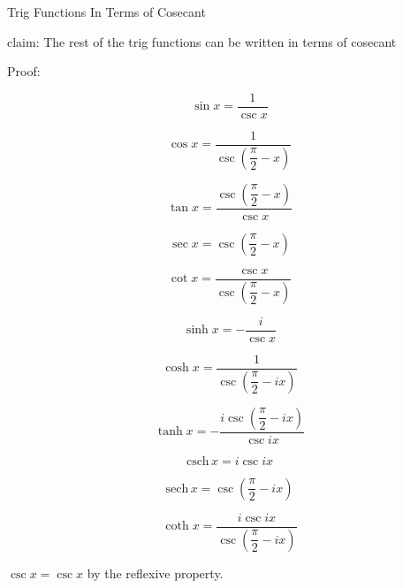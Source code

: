 \documentclass[12pt]{article}
\begin{document}
\pagebreak\begin{section}{Trig Functions In Terms of Cosecant}
	
	\noindent claim: The rest of the trig functions can be written in terms of cosecant

	\noindent Proof:

	\begin{equation}\sin x=\dfrac1{\csc x}\end{equation}

	\begin{equation}\cos x=\dfrac1{\csc\left(\dfrac\pi2-x\right)}\end{equation}

	\begin{equation}\tan x=\dfrac{\csc\left(\dfrac\pi2-x\right)}{\csc x}\end{equation}

	
	\begin{equation}\sec x=\csc\left(\dfrac\pi2-x\right)\end{equation}

	\begin{equation}\cot x=\dfrac{\csc x}{\csc\left(\dfrac\pi2-x\right)}\end{equation}


	\begin{equation}\sinh x=-\dfrac i{\csc x}\end{equation}

	\begin{equation}\cosh x=\dfrac1{\csc\left(\dfrac\pi2-ix\right)}\end{equation}

	\begin{equation}\tanh x=-\dfrac{i\csc\left(\dfrac\pi2-ix\right)}{\csc ix}\end{equation}

	\begin{equation}\text{csch}\,x=i\csc ix\end{equation}

	\begin{equation}\text{sech}\,x=\csc\left(\dfrac\pi2-ix\right)\end{equation}

	\begin{equation}\coth x=\dfrac{i\csc ix}{\csc\left(\dfrac\pi2-ix\right)}\end{equation}

	\centerline{$\csc x=\csc x$ by the reflexive property.}

	\noindent\blacksquare
\end{section}
\end{document}
